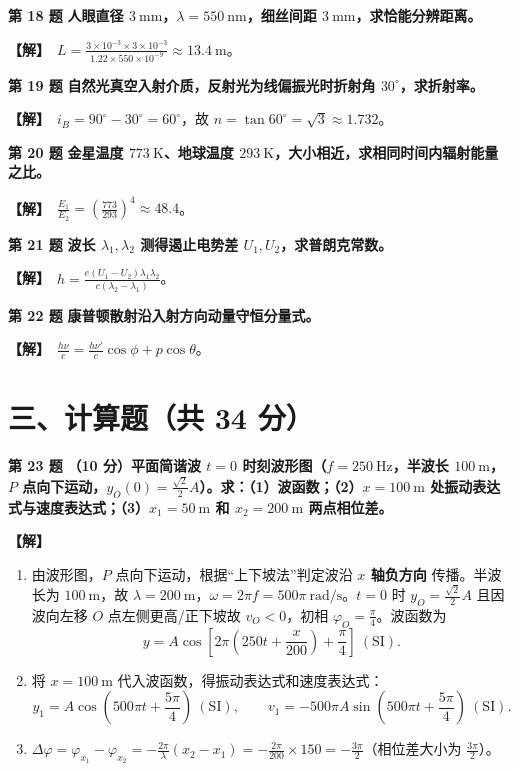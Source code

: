 \documentclass[zihao=5,a4paper,UTF8]{ctexart}
\newenvironment{prob}[2]{%
    \par\vspace{5pt}\noindent\textbf{\color{navy}#1} \textbf{#2}\par\nopagebreak\vspace{2pt}%
}{%
    \par\vspace{3pt}%
}
\newcommand{\sol}{\noindent\textbf{\color{tealaccent}【解】}\ }
\begin{document}
\begin{prob}{第 18 题}{人眼直径 $3\ \mathrm{mm}$，$\lambda=550\ \mathrm{nm}$，细丝间距 $3\ \mathrm{mm}$，求恰能分辨距离。}
\sol $L = \frac{3\times 10^{-3}\times 3\times 10^{-3}}{1.22\times 550\times 10^{-9}} \approx 13.4\ \mathrm{m}$。
\end{prob}

\begin{prob}{第 19 题}{自然光真空入射介质，反射光为线偏振光时折射角 $30^\circ$，求折射率。}
\sol $i_B = 90^\circ - 30^\circ = 60^\circ$，故 $n = \tan 60^\circ = \sqrt{3} \approx 1.732$。
\end{prob}

\begin{prob}{第 20 题}{金星温度 $773\ \mathrm{K}$、地球温度 $293\ \mathrm{K}$，大小相近，求相同时间内辐射能量之比。}
\sol $\frac{E_1}{E_2} = \left(\frac{773}{293}\right)^4 \approx 48.4$。
\end{prob}

\begin{prob}{第 21 题}{波长 $\lambda_1, \lambda_2$ 测得遏止电势差 $U_1, U_2$，求普朗克常数。}
\sol $h = \frac{e(U_1 - U_2)\lambda_1\lambda_2}{c(\lambda_2 - \lambda_1)}$。
\end{prob}

\begin{prob}{第 22 题}{康普顿散射沿入射方向动量守恒分量式。}
\sol $\frac{h\nu}{c} = \frac{h\nu'}{c}\cos\phi + p\cos\theta$。
\end{prob}

\section*{三、计算题（共 34 分）}

\begin{prob}{第 23 题}{（10 分）平面简谐波 $t=0$ 时刻波形图（$f=250\ \mathrm{Hz}$，半波长 $100\ \mathrm{m}$，$P$ 点向下运动，$y_O(0) = \frac{\sqrt{2}}{2}A$）。求：（1）波函数；（2）$x=100\ \mathrm{m}$ 处振动表达式与速度表达式；（3）$x_1=50\ \mathrm{m}$ 和 $x_2=200\ \mathrm{m}$ 两点相位差。}
\sol
\begin{enumerate}[leftmargin=2em, itemsep=2pt]
    \item 由波形图，$P$ 点向下运动，根据“上下坡法”判定波沿 \textbf{$x$ 轴负方向} 传播。半波长为 $100\ \mathrm{m}$，故 $\lambda = 200\ \mathrm{m}$，$\omega = 2\pi f = 500\pi\ \mathrm{rad/s}$。$t=0$ 时 $y_O = \frac{\sqrt{2}}{2}A$ 且因波向左移 $O$ 点左侧更高/正下坡故 $v_O < 0$，初相 $\varphi_O = \frac{\pi}{4}$。波函数为
    \[
        y = A\cos\left[2\pi\left(250t + \frac{x}{200}\right) + \frac{\pi}{4}\right]\ (\mathrm{SI}).
    \]
    \item 将 $x = 100\ \mathrm{m}$ 代入波函数，得振动表达式和速度表达式：
    \[
        y_1 = A\cos\left(500\pi t + \frac{5\pi}{4}\right)\ (\mathrm{SI}),\qquad v_1 = -500\pi A\sin\left(500\pi t + \frac{5\pi}{4}\right)\ (\mathrm{SI}).
    \]
    \item $\Delta\varphi = \varphi_{x_1} - \varphi_{x_2} = -\frac{2\pi}{\lambda}(x_2 - x_1) = -\frac{2\pi}{200}\times 150 = -\frac{3\pi}{2}$（相位差大小为 $\frac{3\pi}{2}$）。
\end{enumerate}
\end{prob}
\end{document}

